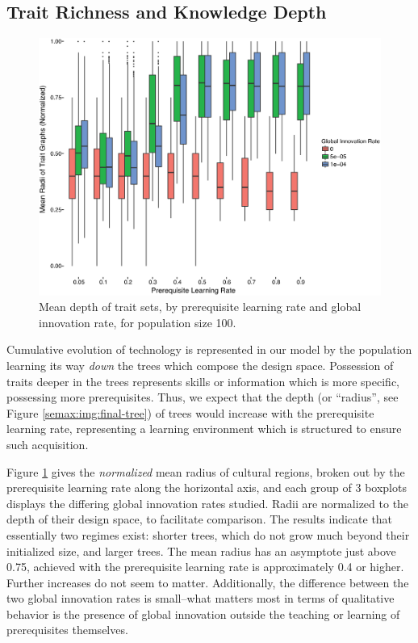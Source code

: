 \subsection{Trait Richness and Knowledge
Depth}\label{trait-richness-and-knowledge-depth}

\begin{figure}[htbp] 
\centering 
\includegraphics[scale=0.4]{graphics/semanticaxelrod/mean-radius-by-learning-rate-innov-12.eps} 
\caption{Mean depth of trait sets, by prerequisite learning rate and global innovation rate, for population size 100.} 
\label{semax:img:mean-radius-cultures-100} 
\end{figure}

Cumulative evolution of technology is represented in our model by the
population learning its way \emph{down} the trees which compose the
design space. Possession of traits deeper in the trees represents skills
or information which is more specific, possessing more prerequisites.
Thus, we expect that the depth (or ``radius'', see Figure
\ref{semax:img:final-tree}) of trees would increase with the prerequisite
learning rate, representing a learning environment which is structured
to ensure such acquisition.

Figure \ref{semax:img:mean-radius-cultures-100} gives the \emph{normalized}
mean radius of cultural regions, broken out by the prerequisite learning
rate along the horizontal axis, and each group of 3 boxplots displays
the differing global innovation rates studied. Radii are normalized to
the depth of their design space, to facilitate comparison. The results
indicate that essentially two regimes exist: shorter trees, which do not
grow much beyond their initialized size, and larger trees. The mean
radius has an asymptote just above 0.75, achieved with the prerequisite
learning rate is approximately 0.4 or higher. Further increases do not
seem to matter. Additionally, the difference between the two global
innovation rates is small--what matters most in terms of qualitative
behavior is the presence of global innovation outside the teaching or
learning of prerequisites themselves.

